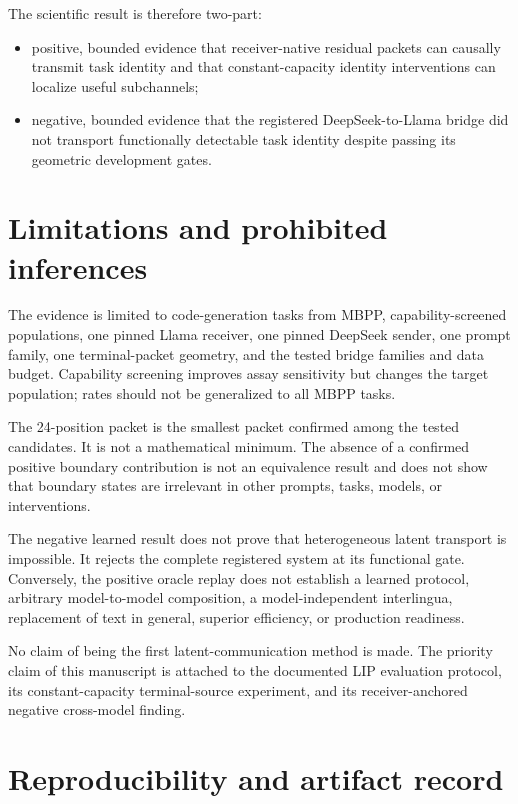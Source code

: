 \documentclass[11pt]{article}
\begin{document}
The scientific result is therefore two-part:

\begin{itemize}
  \item positive, bounded evidence that receiver-native residual packets can causally transmit task identity and that constant-capacity identity interventions can localize useful subchannels;
  \item negative, bounded evidence that the registered DeepSeek-to-Llama bridge did not transport functionally detectable task identity despite passing its geometric development gates.
\end{itemize}

\section{Limitations and prohibited inferences}

The evidence is limited to code-generation tasks from MBPP, capability-screened populations, one pinned Llama receiver, one pinned DeepSeek sender, one prompt family, one terminal-packet geometry, and the tested bridge families and data budget. Capability screening improves assay sensitivity but changes the target population; rates should not be generalized to all MBPP tasks.

The 24-position packet is the smallest packet confirmed among the tested candidates. It is not a mathematical minimum. The absence of a confirmed positive boundary contribution is not an equivalence result and does not show that boundary states are irrelevant in other prompts, tasks, models, or interventions.

The negative learned result does not prove that heterogeneous latent transport is impossible. It rejects the complete registered system at its functional gate. Conversely, the positive oracle replay does not establish a learned protocol, arbitrary model-to-model composition, a model-independent interlingua, replacement of text in general, superior efficiency, or production readiness.

No claim of being the first latent-communication method is made. The priority claim of this manuscript is attached to the documented LIP evaluation protocol, its constant-capacity terminal-source experiment, and its receiver-anchored negative cross-model finding.

\section{Reproducibility and artifact record}
\end{document}
